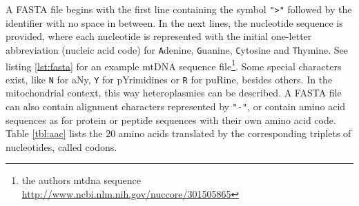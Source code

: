 A FASTA file begins with the first line containing the symbol \verb|">"| followed by the identifier with no space in between. In the next lines, the nucleotide sequence is provided, where each nucleotide is represented with the initial one-letter abbreviation (nucleic acid code) for \verb|A|denine, \verb|G|uanine, \verb|C|ytosine and \verb|T|hymine. See listing  \ref{lst:fasta} for an example mtDNA sequence file\footnote{the authors mtdna sequence \url{http://www.ncbi.nlm.nih.gov/nuccore/301505865}}. Some special characters exist, like \verb|N| for aNy, \verb|Y| for pYrimidines or \verb|R| for puRine, besides others. In the mitochondrial context, this way heteroplasmies can be described. A FASTA file can also contain alignment characters represented by \verb|"-"|,  or contain amino acid sequences as for protein or peptide sequences with their own amino acid code. Table \ref{tbl:aac} lists the 20 amino acids translated by the corresponding triplets of nucleotides, called codons.

